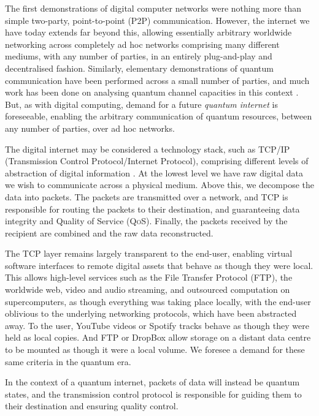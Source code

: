 \documentclass[aps, rmp, twocolumn, amsmath, amssymb, nofootinbib, superscriptaddress, longbibliography, floatfix, table-of-contents, eqsecnum]{revtex4-1}
\begin{document}
The first demonstrations of digital computer networks were nothing more than simple two-party, point-to-point (P2P) communication. However, the internet we have today extends far beyond this, allowing essentially arbitrary worldwide networking across completely ad hoc networks comprising many different mediums, with any number of parties, in an entirely plug-and-play and decentralised fashion. Similarly, elementary demonstrations of quantum communication have been performed across a small number of parties, and much work has been done on analysing quantum channel capacities in this context \cite{??? channel_capacity}. But, as with digital computing, demand for a future \textit{quantum internet} is foreseeable, enabling the arbitrary communication of quantum resources, between any number of parties, over ad hoc networks.

The digital internet may be considered a technology stack, such as TCP/IP (Transmission Control Protocol/Internet Protocol), comprising different levels of abstraction of digital information \cite{bib:TanenbaumNet}. At the lowest level we have raw digital data we wish to communicate across a physical medium. Above this, we decompose the data into packets. The packets are transmitted over a network, and TCP is responsible for routing the packets to their destination, and guaranteeing data integrity and Quality of Service (\textsc{QoS}). Finally, the packets received by the recipient are combined and the raw data reconstructed.

The TCP layer remains largely transparent to the end-user, enabling virtual software interfaces to remote digital assets that behave as though they were local. This allows high-level services such as the File Transfer Protocol (FTP), the worldwide web, video and audio streaming, and outsourced computation on supercomputers, as though everything was taking place locally, with the end-user oblivious to the underlying networking protocols, which have been abstracted away. To the user, YouTube videos or Spotify tracks behave as though they were held as local copies. And FTP or DropBox allow storage on a distant data centre to be mounted as though it were a local volume. We foresee a demand for these same criteria in the quantum era.

In the context of a quantum internet, packets of data will instead be quantum states, and the transmission control protocol is responsible for guiding them to their destination and ensuring quality control.
\end{document}
